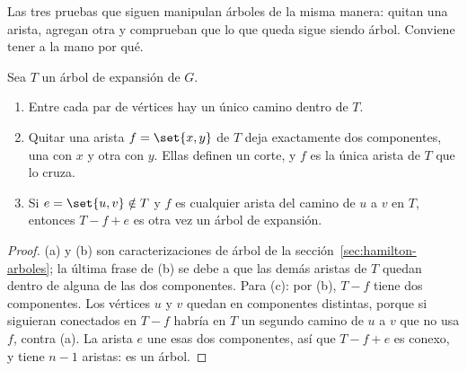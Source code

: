 \documentclass[11pt,letterpaper]{article}
\begin{document}
\begin{ejemplo}
\begin{center}
  \end{center}
\end{ejemplo}

Las tres pruebas que siguen manipulan árboles de la misma manera:
quitan una arista, agregan otra y comprueban que lo que queda sigue
siendo árbol. Conviene tener a la mano por qué.

\begin{lema}
  \label{lem:hechos-arboles-mst}
  Sea $T$ un árbol de expansión de $G$.
  \begin{enumerate}[label=(\alph*), itemsep=0.1em]
    \item Entre cada par de vértices hay un único camino dentro de
          $T$.
    \item Quitar una arista $f = \set{x, y}$ de $T$ deja exactamente
          dos componentes, una con $x$ y otra con $y$. Ellas definen
          un corte, y $f$ es la única arista de $T$ que lo cruza.
    \item Si $e = \set{u, v} \notin T$ y $f$ es cualquier arista del
          camino de $u$ a $v$ en $T$, entonces $T - f + e$ es otra vez
          un árbol de expansión.
  \end{enumerate}
\end{lema}

\begin{proof}
  (a) y (b) son caracterizaciones de árbol de la
  sección~\ref{sec:hamilton-arboles}; la última frase de (b) se debe a
  que las demás aristas de $T$ quedan dentro de alguna de las dos
  componentes. Para (c): por (b), $T - f$ tiene dos componentes. Los
  vértices $u$ y $v$ quedan en componentes distintas, porque si
  siguieran conectados en $T - f$ habría en $T$ un segundo camino de
  $u$ a $v$ que no usa $f$, contra (a). La arista $e$ une esas dos
  componentes, así que $T - f + e$ es conexo, y tiene $n - 1$
  aristas: es un árbol.
\end{proof}
\end{document}
